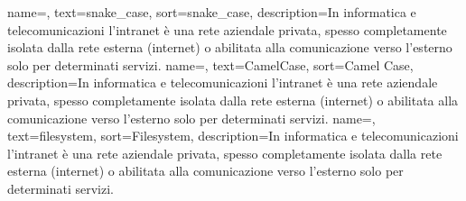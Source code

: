 {
	name=,
	text=snake\_case,
	sort=snake\_case,
	description={In informatica e telecomunicazioni l'intranet è una rete aziendale privata, spesso completamente isolata dalla rete esterna (internet) o abilitata alla comunicazione verso l'esterno solo per determinati servizi.}
}
{
	name=,
	text=CamelCase,
	sort=Camel Case,
	description={In informatica e telecomunicazioni l'intranet è una rete aziendale privata, spesso completamente isolata dalla rete esterna (internet) o abilitata alla comunicazione verso l'esterno solo per determinati servizi.}
}
{
	name=,
	text=filesystem,
	sort=Filesystem,
	description={In informatica e telecomunicazioni l'intranet è una rete aziendale privata, spesso completamente isolata dalla rete esterna (internet) o abilitata alla comunicazione verso l'esterno solo per determinati servizi.}
}